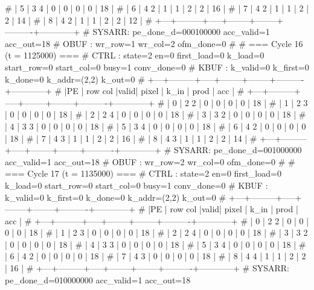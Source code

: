 # | 5 |   3   4 |  0  |      0 |      0 |        0 |         18 |
# | 6 |   4   2 |  1  |      1 |      2 |        2 |         16 |
# | 7 |   4   2 |  1  |      1 |      2 |        2 |         14 |
# | 8 |   4   2 |  1  |      1 |      2 |        2 |         12 |
# +---+---------+-----+--------+--------+----------+------------+
# SYSARR: pe_done_d=000100000 acc_valid=1 acc_out=18
# OBUF : wr_row=1 wr_col=2 ofm_done=0
# 
# === Cycle 16  (t = 1125000) ===
# CTRL : state=2 en=0 first_load=0 k_load=0 start_row=0 start_col=0 busy=1 conv_done=0
# KBUF : k_valid=0 k_first=0 k_done=0 k_addr=(2,2) k_out=0
# +---+---------+-----+--------+--------+----------+------------+
# |PE | row col |valid| pixel  |  k_in  |   prod   |    acc     |
# +---+---------+-----+--------+--------+----------+------------+
# | 0 |   2   2 |  0  |      0 |      0 |        0 |         18 |
# | 1 |   2   3 |  0  |      0 |      0 |        0 |         18 |
# | 2 |   2   4 |  0  |      0 |      0 |        0 |         18 |
# | 3 |   3   2 |  0  |      0 |      0 |        0 |         18 |
# | 4 |   3   3 |  0  |      0 |      0 |        0 |         18 |
# | 5 |   3   4 |  0  |      0 |      0 |        0 |         18 |
# | 6 |   4   2 |  0  |      0 |      0 |        0 |         18 |
# | 7 |   4   3 |  1  |      1 |      2 |        2 |         16 |
# | 8 |   4   3 |  1  |      1 |      2 |        2 |         14 |
# +---+---------+-----+--------+--------+----------+------------+
# SYSARR: pe_done_d=001000000 acc_valid=1 acc_out=18
# OBUF : wr_row=2 wr_col=0 ofm_done=0
# 
# === Cycle 17  (t = 1135000) ===
# CTRL : state=2 en=0 first_load=0 k_load=0 start_row=0 start_col=0 busy=1 conv_done=0
# KBUF : k_valid=0 k_first=0 k_done=0 k_addr=(2,2) k_out=0
# +---+---------+-----+--------+--------+----------+------------+
# |PE | row col |valid| pixel  |  k_in  |   prod   |    acc     |
# +---+---------+-----+--------+--------+----------+------------+
# | 0 |   2   2 |  0  |      0 |      0 |        0 |         18 |
# | 1 |   2   3 |  0  |      0 |      0 |        0 |         18 |
# | 2 |   2   4 |  0  |      0 |      0 |        0 |         18 |
# | 3 |   3   2 |  0  |      0 |      0 |        0 |         18 |
# | 4 |   3   3 |  0  |      0 |      0 |        0 |         18 |
# | 5 |   3   4 |  0  |      0 |      0 |        0 |         18 |
# | 6 |   4   2 |  0  |      0 |      0 |        0 |         18 |
# | 7 |   4   3 |  0  |      0 |      0 |        0 |         18 |
# | 8 |   4   4 |  1  |      1 |      2 |        2 |         16 |
# +---+---------+-----+--------+--------+----------+------------+
# SYSARR: pe_done_d=010000000 acc_valid=1 acc_out=18
